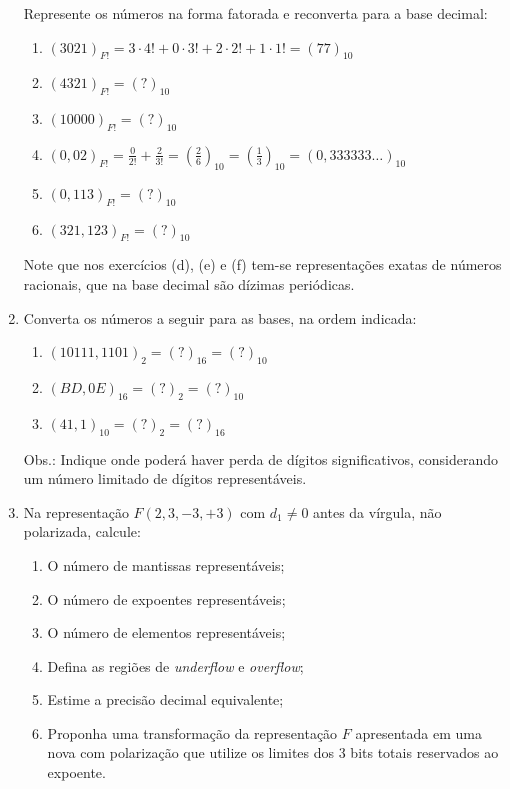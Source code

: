 \documentclass[12pt]{article}
\newenvironment{smallitem}{
    \vspace{-2mm}
    \begin{enumerate}
    \setlength{\parskip}{0pt}
    \setlength{\itemsep}{2pt}
}{
    \vspace{-2mm}
    \end{enumerate}
}
\begin{document}
\begin{enumerate}[label=\textbf{\arabic*})]
Represente os números na forma fatorada e reconverta para a base decimal:

\begin{smallitem}

\item $(3021)_{F!} = 3 \cdot 4! + 0 \cdot 3! + 2 \cdot 2! + 1 \cdot 1!
= (77)_{10}$
\item $(4321)_{F!} = (?)_{10}$
\item $(10000)_{F!} = (?)_{10}$
\item $(0,02)_{F!} = \frac{0}{2!} + \frac{2}{3!} = (\frac{2}{6})_{10}
= (\frac{1}{3})_{10} = (0,333333 \dots)_{10}$
\item $(0,113)_{F!} = (?)_{10}$
\item $(321,123)_{F!} = (?)_{10}$

\end{smallitem}

Note que nos exercícios (d), (e) e (f) tem-se representações exatas de
números racionais, que na base decimal são dízimas periódicas.

\item Converta os números a seguir para as bases, na ordem indicada:

\begin{smallitem}

\item $(10111,1101)_2 = (?)_{16} = (?)_{10}$
\item $(BD,0E)_{16} = (?)_2 = (?)_{10}$
\item $(41,1)_{10} = (?)_2 = (?)_{16}$

\end{smallitem}

Obs.: Indique onde poderá haver perda de dígitos significativos,
considerando um número limitado de dígitos representáveis.

\item Na representação $F(2, 3, -3, +3)$ com $d_1 \neq 0$ antes da vírgula,
não polarizada, calcule:

\begin{smallitem}

\item O número de mantissas representáveis;
\item O número de expoentes representáveis;
\item O número de elementos representáveis;
\item Defina as regiões de \textit{underflow} e \textit{overflow};
\item Estime a precisão decimal equivalente;
\item Proponha uma transformação da representação $F$ apresentada em
uma nova com polarização que utilize os limites dos 3 bits totais
reservados ao expoente.


\end{smallitem}
\end{enumerate}
\end{document}
